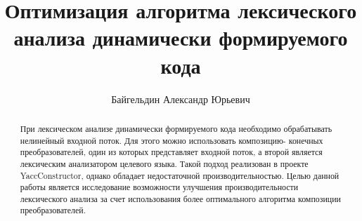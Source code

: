 \title{Оптимизация алгоритма лексического анализа динамически формируемого кода}


\author{Байгельдин Александр Юрьевич}



\maketitle             

\begin{abstract}
При лексическом анализе динамически формируемого кода необходимо обрабатывать нелинейный входной поток.
Для этого  можно использовать композицию- конечных преобразователей,
один из которых представляет входной поток, а второй является лексическим анализатором целевого языка.
Такой подход реализован в проекте YaccConstructor, однако обладает недостаточной производительностью. 
Целью данной работы является исследование возможности улучшения производительности лексического анализа 
за счет использования более оптимального алгоритма композиции преобразователей.
\end{abstract}







